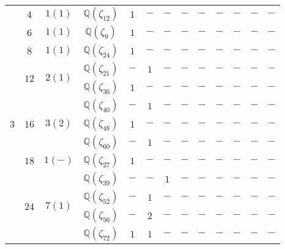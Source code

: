 \documentclass[12pt,a4paper,halfparskip,headsepline,bibtotocnumbered]{scrreprt}
\theoremstyle{nummermitklammern}
\theoremstyle{nonumberbreak}
\newcommand{\Q}{\mathbb{Q}}
\begin{document}
\begin{table}
\begin{tabular}{|c|c|c|c|c|c|c|c|c|c|c|c|c|}
		\multirow{13}{*}{$3$}	&$4$					&$1(1)$						&$\Q(\zeta_{12})$	&$1$	&$-$	&$-$	&$-$	&$-$	&$-$	&$-$	&$-$	&$-$\\ \cline{2-13}
								&$6$					&$1(1)$						&$\Q(\zeta_{9})$	&$1$	&$-$	&$-$	&$-$	&$-$	&$-$	&$-$	&$-$	&$-$\\ \cline{2-13}
								&$8$					&$1(1)$						&$\Q(\zeta_{24})$	&$1$	&$-$	&$-$	&$-$	&$-$	&$-$	&$-$	&$-$	&$-$\\ \cline{2-13}
								&\multirow{2}{*}{$12$}	&\multirow{2}{*}{$2(1)$}	&$\Q(\zeta_{21})$	&$-$	&$1$	&$-$	&$-$	&$-$	&$-$	&$-$	&$-$	&$-$\\ \cline{4-13}
								&						&							&$\Q(\zeta_{36})$	&$1$	&$-$	&$-$	&$-$	&$-$	&$-$	&$-$	&$-$	&$-$\\ \cline{2-13}
								&\multirow{3}{*}{$16$}	&\multirow{3}{*}{$3(2)$}	&$\Q(\zeta_{40})$	&$-$	&$1$	&$-$	&$-$	&$-$	&$-$	&$-$	&$-$	&$-$\\ \cline{4-13}
								&						&							&$\Q(\zeta_{48})$	&$1$	&$-$	&$-$	&$-$	&$-$	&$-$	&$-$	&$-$	&$-$\\ \cline{4-13}
								&						&							&$\Q(\zeta_{60})$	&$-$	&$1$	&$-$	&$-$	&$-$	&$-$	&$-$	&$-$	&$-$\\ \cline{2-13}
								&$18$					&$1(-)$						&$\Q(\zeta_{27})$	&$1$	&$-$	&$-$	&$-$	&$-$	&$-$	&$-$	&$-$	&$-$\\ \cline{2-13}
								&\multirow{4}{*}{$24$}	&\multirow{4}{*}{$7(1)$}	&$\Q(\zeta_{39})$	&$-$	&$-$	&$1$	&$-$	&$-$	&$-$	&$-$	&$-$	&$-$\\ \cline{4-13}
								&						&							&$\Q(\zeta_{52})$	&$-$	&$1$	&$-$	&$-$	&$-$	&$-$	&$-$	&$-$	&$-$\\ \cline{4-13}
								&						&							&$\Q(\zeta_{56})$	&$-$	&$2$	&$-$	&$-$	&$-$	&$-$	&$-$	&$-$	&$-$\\ \cline{4-13}
								&						&							&$\Q(\zeta_{72})$	&$1$	&$1$	&$-$	&$-$	&$-$	&$-$	&$-$	&$-$	&$-$\\ \hline
	\end{tabular}
\end{table}
\end{document}
